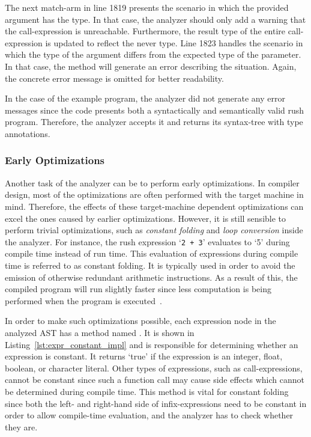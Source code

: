 The next match-arm in line 1819 presents the scenario in which the provided argument has the  type.
In that case, the analyzer should only add a warning that the call-expression is unreachable.
Furthermore, the result type of the entire call-expression is updated to reflect the never type.
Line 1823 handles the scenario in which the type of the argument differs from the expected type of the parameter.
In that case, the method will generate an error describing the situation.
Again, the concrete error message is omitted for better readability.

In the case of the example program, the analyzer did not generate any error messages since the code presents both a syntactically and semantically valid rush program.
Therefore, the analyzer accepts it and returns its syntax-tree with type annotations.

\subsubsection{Early Optimizations}

Another task of the analyzer can be to perform early optimizations.
In compiler design, most of the optimizations are often performed with the target machine in mind.
Therefore, the effects of these target-machine dependent optimizations can excel the ones caused by earlier optimizations.
However, it is still sensible to perform trivial optimizations, such as \emph{constant folding} and \emph{loop conversion} inside the analyzer.
For instance, the rush expression `\texttt{2~+~3}' evaluates to `5' during compile time instead of run time.
This evaluation of expressions during compile time is referred to as constant folding.
It is typically used in order to avoid the emission of otherwise redundant arithmetic instructions.
As a result of this, the compiled program will run slightly faster since less computation is being performed when the program is executed~\cite[p.~54]{wirth_compiler_construction_2005}.



In order to make such optimizations possible, each expression node in the analyzed AST has a method named .
It is shown in Listing~\ref{lst:expr_constant_impl} and is responsible for determining whether an expression is constant.
It returns `true' if the expression is an integer, float, boolean, or character literal.
Other types of expressions, such as call-expressions, cannot be constant since such a function call may cause side effects which cannot be determined during compile time.
This method is vital for constant folding since both the left- and right-hand side of infix-expressions need to be constant in order to allow compile-time evaluation, and the analyzer has to check whether they are.

